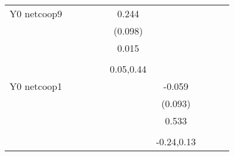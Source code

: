 \begin{table}[!h]
\begin{adjustbox}{width=\columnwidth,center}
\begin{tabular}{l*{8}{c}}
Y0 netcoop9         &                     &                     &                     &                     &       0.244\sym{**} &                     &                     &                     &                     &                     \\
                    &                     &                     &                     &                     &     (0.098)         &                     &                     &                     &                     &                     \\
                    &                     &                     &                     &                     &       0.015         &                     &                     &                     &                     &                     \\
                    &                     &                     &                     &                     &                     &                     &                     &                     &                     &                     \\
                    &                     &                     &                     &                     &   0.05,0.44         &                     &                     &                     &                     &                     \\
Y0 netcoop1         &                     &                     &                     &                     &                     &      -0.059         &                     &                     &                     &                     \\
                    &                     &                     &                     &                     &                     &     (0.093)         &                     &                     &                     &                     \\
                    &                     &                     &                     &                     &                     &       0.533         &                     &                     &                     &                     \\
                    &                     &                     &                     &                     &                     &                     &                     &                     &                     &                     \\
                    &                     &                     &                     &                     &                     &  -0.24,0.13         &                     &                     &                     &                     \\

\end{tabular}
\end{adjustbox}
\end{table}
